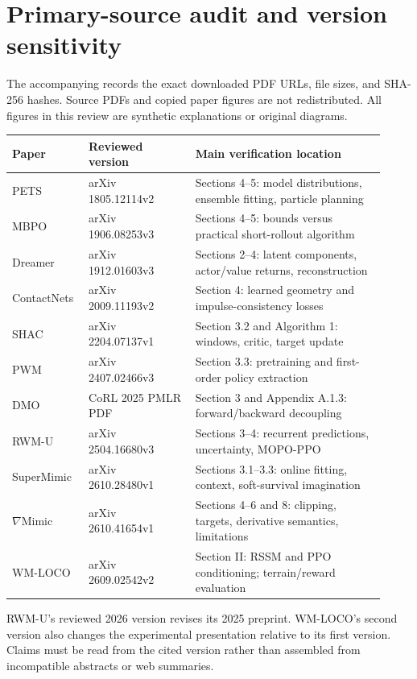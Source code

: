 \section{Primary-source audit and version sensitivity}\label{app:sources}
The accompanying  records the exact downloaded PDF
URLs, file sizes, and SHA-256 hashes. Source PDFs and copied paper figures are
not redistributed. All figures in this review are synthetic explanations or
original diagrams.

\begin{longtable}{@{}L{0.17\linewidth}L{0.27\linewidth}L{0.48\linewidth}@{}}
\toprule Paper & Reviewed version & Main verification location\\\midrule\endhead
PETS & arXiv 1805.12114v2 & Sections 4--5: model distributions, ensemble fitting, particle planning\\
MBPO & arXiv 1906.08253v3 & Sections 4--5: bounds versus practical short-rollout algorithm\\
Dreamer & arXiv 1912.01603v3 & Sections 2--4: latent components, actor/value returns, reconstruction\\
ContactNets & arXiv 2009.11193v2 & Section 4: learned geometry and impulse-consistency losses\\
SHAC & arXiv 2204.07137v1 & Section 3.2 and Algorithm 1: windows, critic, target update\\
PWM & arXiv 2407.02466v3 & Section 3.3: pretraining and first-order policy extraction\\
DMO & CoRL 2025 PMLR PDF & Section 3 and Appendix A.1.3: forward/backward decoupling\\
RWM-U & arXiv 2504.16680v3 & Sections 3--4: recurrent predictions, uncertainty, MOPO-PPO\\
SuperMimic & arXiv 2610.28480v1 & Sections 3.1--3.3: online fitting, context, soft-survival imagination\\
$\nabla$Mimic & arXiv 2610.41654v1 & Sections 4--6 and 8: clipping, targets, derivative semantics, limitations\\
WM-LOCO & arXiv 2609.02542v2 & Section II: RSSM and PPO conditioning; terrain/reward evaluation\\
\bottomrule
\end{longtable}

RWM-U's reviewed 2026 version revises its 2025 preprint. WM-LOCO's second version
also changes the experimental presentation relative to its first version. Claims
must be read from the cited version rather than assembled from incompatible
abstracts or web summaries.


